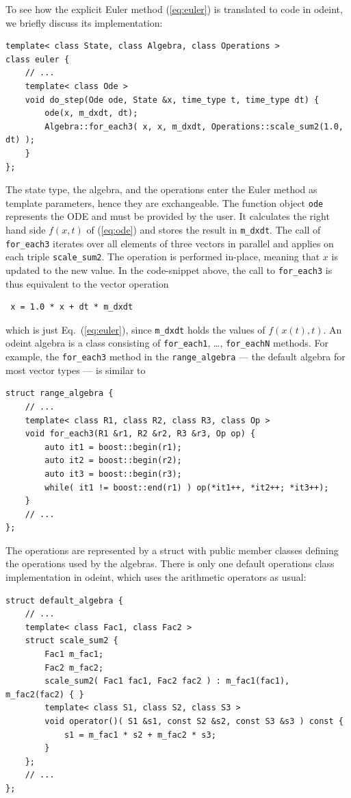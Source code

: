 \documentclass[final]{siamltex}
\newcommand{\code}[1]{\lstinline|#1|}
\newcommand{\eqref}[1]{(\ref{#1})}
\begin{document}
To see how the explicit Euler method \eqref{eq:euler} is translated to
code in odeint, we briefly discuss its implementation:
\begin{lstlisting}
template< class State, class Algebra, class Operations >
class euler {
    // ...
    template< class Ode >
    void do_step(Ode ode, State &x, time_type t, time_type dt) {
        ode(x, m_dxdt, dt);
        Algebra::for_each3( x, x, m_dxdt, Operations::scale_sum2(1.0, dt) );
    }
};
\end{lstlisting}
The state type, the algebra, and the operations enter the Euler method as
template parameters, hence they are exchangeable. The function object \code{ode}
represents the ODE and must be provided by the user. It calculates the right
hand side $f(x,t)$ of \eqref{eq:ode} and stores the result in \code{m_dxdt}.
The call of \code{for_each3} iterates over all elements of three vectors in
parallel and applies on each triple \code{scale_sum2}. The operation is
performed in-place, meaning that $x$ is updated to the new value.  In the
code-snippet above, the call to \code{for_each3} is thus equivalent to the
vector operation
\begin{lstlisting}
 x = 1.0 * x + dt * m_dxdt
\end{lstlisting}
which is just Eq.~\eqref{eq:euler}, since \code{m_dxdt} holds the values of
$f(x(t), t)$.  An odeint algebra is a class consisting of
\code{for_each1}, \dots, \code{for_eachN} methods. For example, the
\code{for_each3} method in the \code{range_algebra} --- the default algebra for
most vector types --- is similar to
\begin{lstlisting}
struct range_algebra {
    // ...
    template< class R1, class R2, class R3, class Op >
    void for_each3(R1 &r1, R2 &r2, R3 &r3, Op op) {
        auto it1 = boost::begin(r1);
        auto it2 = boost::begin(r2);
        auto it3 = boost::begin(r3);
        while( it1 != boost::end(r1) ) op(*it1++, *it2++; *it3++);
    }
    // ...
};
\end{lstlisting}
The operations are represented by a struct with public member classes defining the
operations used by the algebras. There is only one default
operations class implementation in odeint, which uses the arithmetic operators as usual:
\begin{lstlisting}
struct default_algebra {
    // ...
    template< class Fac1, class Fac2 >
    struct scale_sum2 {
        Fac1 m_fac1;
        Fac2 m_fac2;
        scale_sum2( Fac1 fac1, Fac2 fac2 ) : m_fac1(fac1), m_fac2(fac2) { }
        template< class S1, class S2, class S3 >
        void operator()( S1 &s1, const S2 &s2, const S3 &s3 ) const {
            s1 = m_fac1 * s2 + m_fac2 * s3;
        }
    };
    // ...
};
\end{lstlisting}
\end{document}

